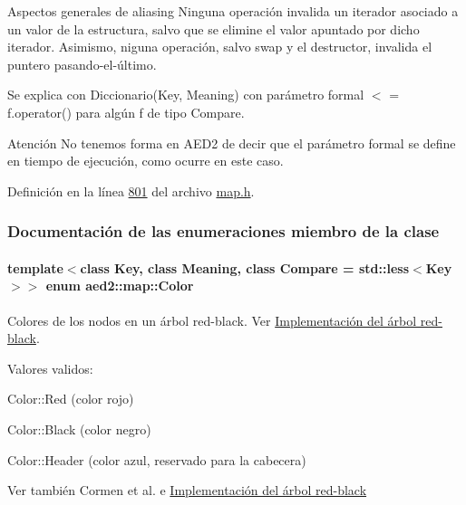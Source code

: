 \begin{DoxyParagraph}{\-Aspectos generales de aliasing}
\-Ninguna operación invalida un iterador asociado a un valor de la estructura, salvo que se elimine el valor apuntado por dicho iterador. \-Asimismo, niguna operación, salvo swap y el destructor, invalida el puntero pasando-\/el-\/último.
\end{DoxyParagraph}
\begin{DoxyParagraph}{\-Se explica con}
\-Diccionario(\-Key, \-Meaning) con parámetro formal $<$ = f.\-operator() para algún f de tipo \-Compare.
\end{DoxyParagraph}
\begin{DoxyAttention}{\-Atención}
\-No tenemos forma en \-A\-E\-D2 de decir que el parámetro formal se define en tiempo de ejecución, como ocurre en este caso. 
\end{DoxyAttention}


\-Definición en la línea \hyperlink{map_8h_source_l00801}{801} del archivo \hyperlink{map_8h_source}{map.\-h}.



\subsubsection{\-Documentación de las enumeraciones miembro de la clase}
\hypertarget{classaed2_1_1map_a6d62a415a4b9d320b30cada4ebcf9f5b_a6d62a415a4b9d320b30cada4ebcf9f5b}{
\paragraph[{\-Color}]{\setlength{\rightskip}{0pt plus 5cm}template$<$class \-Key, class \-Meaning, class \-Compare = std\-::less$<$\-Key$>$$>$ enum {\bf aed2\-::map\-::\-Color}}}\label{classaed2_1_1map_a6d62a415a4b9d320b30cada4ebcf9f5b_a6d62a415a4b9d320b30cada4ebcf9f5b}


\-Colores de los nodos en un árbol red-\/black. \-Ver \hyperlink{Implementacion}{\-Implementación del árbol red-\/black}. 

\-Valores validos\-: \begin{DoxyItemize}
\item \-Color\-::\-Red (color rojo) \item \-Color\-::\-Black (color negro) \item \-Color\-::\-Header (color azul, reservado para la cabecera)\end{DoxyItemize}
\begin{DoxySeeAlso}{\-Ver también}
\-Cormen et al. \cite{CormenLeisersonRivestStein2009} e \hyperlink{Implementacion}{\-Implementación del árbol red-\/black} 
\end{DoxySeeAlso}


